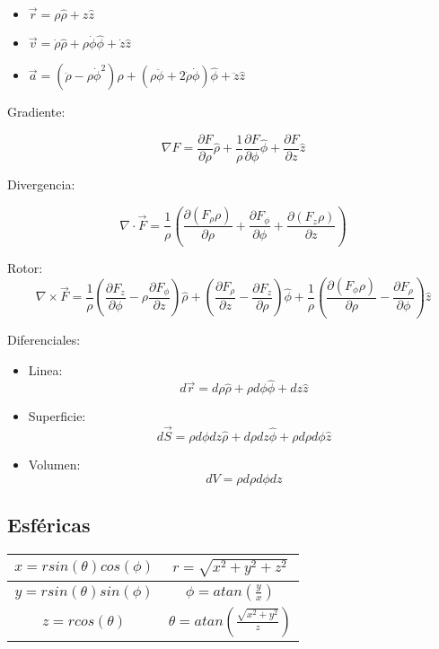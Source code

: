 \begin{itemize}
    \item $\vec{r} = \rho\hat{\rho} + z\hat{z}$
    \item $\vec{v} = \dot{\rho}\hat{\rho} + \rho\dot{\phi}\hat{\phi} + \dot{z}\hat{z}$
    \item $\vec{a} = (\ddot{\rho}-\rho\dot{\phi}^2)\hat{\rho} + (\rho\ddot{\phi}+2\dot{\rho}\dot{\phi})\hat{\phi} + \ddot{z}\hat{z}$
\end{itemize}

\medbreak

Gradiente:

\[\nabla F = \frac{\partial F}{\partial \rho}\hat{\rho} + \frac{1}{\rho}\frac{\partial F}{\partial \phi}\hat{\phi} + \frac{\partial F}{\partial z}\hat{z}\]

Divergencia:

\[\nabla \cdot \vec{F} = \frac{1}{\rho}\left(\frac{\partial(F_{\rho}\rho)}{\partial\rho}+\frac{\partial F_{\phi}}{\partial\phi}+\frac{\partial(F_{z}\rho)}{\partial z}\right)\]

Rotor:
\[\nabla\times\vec{F} = \frac{1}{\rho}\left(\frac{\partial F_{z}}{\partial \phi}-\rho\frac{\partial F_{\phi}}{\partial z}\right)\hat{\rho} + \left(\frac{\partial F_{\rho}}{\partial z}-\frac{\partial F_{z}}{\partial \rho}\right)\hat{\phi} + \frac{1}{\rho}\left(\frac{\partial(F_{\phi}\rho)}{\partial \rho}-\frac{\partial F_{\rho}}{\partial \phi}\right)\hat{z}\]

\medbreak

Diferenciales:

\begin{itemize}
    \item Linea:
    \[d\vec{r} = d\rho\hat{\rho} + \rho d\phi\hat{\phi}+dz\hat{z}\]
    \item Superficie:
    \[d\vec{S} = \rho d\phi dz\hat{\rho}+d\rho dz\hat{\phi}+\rho d\rho d\phi\hat{z}\]
    \item Volumen:
    \[dV = \rho d\rho d\phi dz\]
\end{itemize}

\newpage

\subsection{Esféricas}

\begin{table}[h]
    \centering
    \begin{tabular}{|c|c|}
        \hline
        $x = rsin(\theta)cos(\phi)$ & $r = \sqrt{x^2 + y^2 + z^2}$ \\
        \hline
        $y = rsin(\theta)sin(\phi)$ & $\phi = atan(\frac{y}{x})$ \\
        \hline
        $z = rcos(\theta)$ & $\theta = atan(\frac{\sqrt{x^2+ y^2}}{z})$ \\
        \hline
    \end{tabular}
\end{table}

